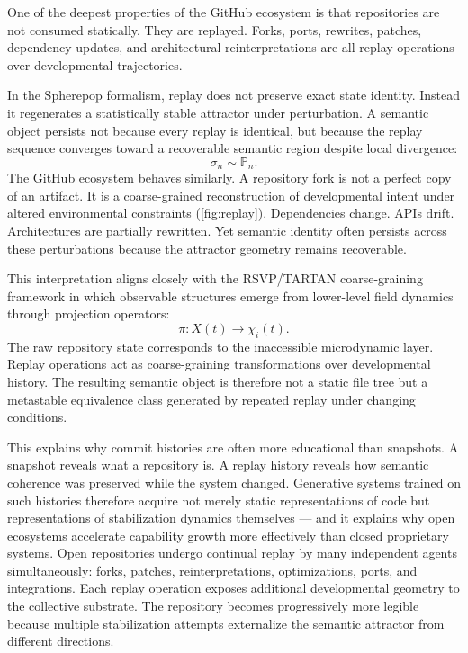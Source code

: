 \documentclass[12pt]{article}
\begin{document}
One of the deepest properties of the GitHub ecosystem is that repositories are
not consumed statically. They are replayed. Forks, ports, rewrites, patches,
dependency updates, and architectural reinterpretations are all replay operations
over developmental trajectories.

In the Spherepop formalism, replay does not preserve exact state identity.
Instead it regenerates a statistically stable attractor under perturbation. A
semantic object persists not because every replay is identical, but because the
replay sequence converges toward a recoverable semantic region despite local
divergence:
\[
\sigma_n \sim \mathbb{P}_n.
\]
The GitHub ecosystem behaves similarly. A repository fork is not a perfect copy
of an artifact. It is a coarse-grained reconstruction of developmental intent
under altered environmental constraints (\cref{fig:replay}). Dependencies change. APIs drift.
Architectures are partially rewritten. Yet semantic identity often persists
across these perturbations because the attractor geometry remains recoverable.

This interpretation aligns closely with the RSVP/TARTAN coarse-graining
framework in which observable structures emerge from lower-level field dynamics
through projection operators:
\[
\pi : X(t) \to \chi_i(t).
\]
The raw repository state corresponds to the inaccessible microdynamic layer.
Replay operations act as coarse-graining transformations over developmental
history. The resulting semantic object is therefore not a static file tree but
a metastable equivalence class generated by repeated replay under changing
conditions.

This explains why commit histories are often more educational than snapshots.
A snapshot reveals what a repository is. A replay history reveals how semantic
coherence was preserved while the system changed. Generative systems trained on
such histories therefore acquire not merely static representations of code but
representations of stabilization dynamics themselves --- and it explains why open
ecosystems accelerate capability growth more effectively than closed proprietary
systems. Open repositories undergo continual replay by many independent agents
simultaneously: forks, patches, reinterpretations, optimizations, ports, and
integrations. Each replay operation exposes additional developmental geometry to
the collective substrate. The repository becomes progressively more legible
because multiple stabilization attempts externalize the semantic attractor from
different directions.
\end{document}
